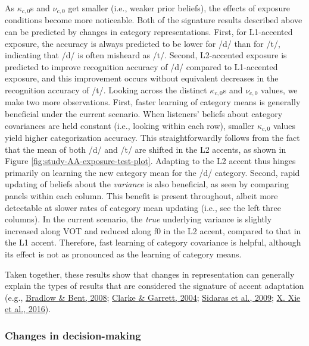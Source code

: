 \documentclass[
  11pt,
  english,
  man,floatsintext]{apa6}
\begin{document}
As \(\kappa_{c,0}\)s and \(\nu_{c,0}\) get smaller (i.e., weaker prior beliefs), the effects of exposure conditions become more noticeable. Both of the signature results described above can be predicted by changes in category representations. First, for L1-accented exposure, the accuracy is always predicted to be lower for /d/ than for /t/, indicating that /d/ is often misheard as /t/. Second, L2-accented exposure is predicted to improve recognition accuracy of /d/ compared to L1-accented exposure, and this improvement occurs without equivalent decreases in the recognition accuracy of /t/.
Looking across the distinct \(\kappa_{c,0}\)s and \(\nu_{c,0}\) values, we make two more observations. First, faster learning of category means is generally beneficial under the current scenario. When listeners' beliefs about category covariances are held constant (i.e., looking within each row), smaller \(\kappa_{c,0}\) values yield higher categorization accuracy. This straightforwardly follows from the fact that the mean of both /d/ and /t/ are shifted in the L2 accents, as shown in Figure \ref{fig:study-AA-exposure-test-plot}. Adapting to the L2 accent thus hinges primarily on learning the new category mean for the /d/ category. Second, rapid updating of beliefs about the \emph{variance} is also beneficial, as seen by comparing panels within each column. This benefit is present throughout, albeit more detectable at slower rates of category mean updating (i.e., see the left three columns). In the current scenario, the \emph{true} underlying variance is slightly increased along VOT and reduced along f0 in the L2 accent, compared to that in the L1 accent. Therefore, fast learning of category covariance is helpful, although its effect is not as pronounced as the learning of category means.

Taken together, these results show that changes in representation can generally explain the types of results that are considered the signature of accent adaptation (e.g., \protect\hyperlink{ref-bradlow-bent2008}{Bradlow \& Bent, 2008}; \protect\hyperlink{ref-clarke-garrett2004}{Clarke \& Garrett, 2004}; \protect\hyperlink{ref-sidaras2009}{Sidaras et al., 2009}; \protect\hyperlink{ref-xie2016}{X. Xie et al., 2016}).

\hypertarget{changes-in-decision-making-1}{%
\subsubsection{Changes in decision-making}\label{changes-in-decision-making-1}}
\end{document}
